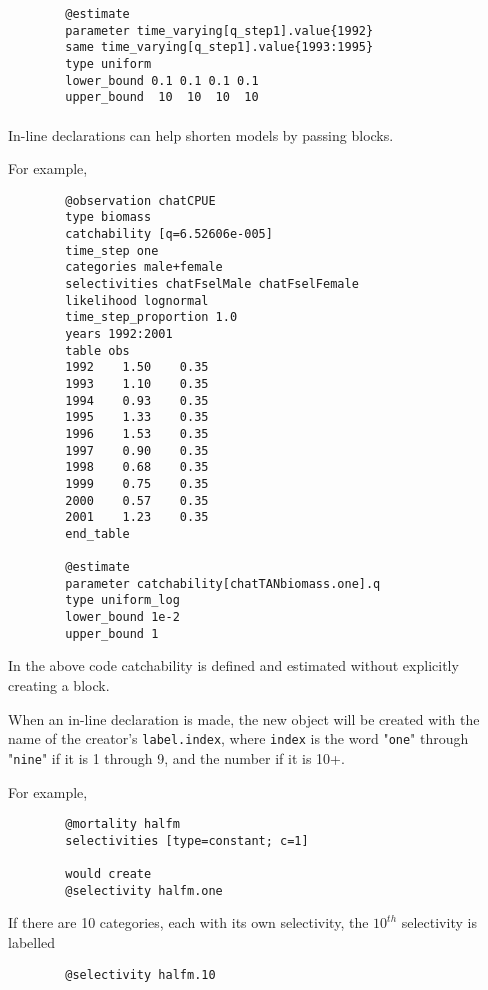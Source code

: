 {\small{\begin{verbatim}
		@estimate
		parameter time_varying[q_step1].value{1992}
		same time_varying[q_step1].value{1993:1995}
		type uniform
		lower_bound 0.1 0.1 0.1 0.1
		upper_bound  10  10  10  10
		\end{verbatim}}}
	
\paragraph*{\label{sec:declare}}

In-line declarations can help shorten models by passing \command{} blocks.

For example,

{\small{\begin{verbatim}
		@observation chatCPUE
		type biomass
		catchability [q=6.52606e-005]
		time_step one
		categories male+female
		selectivities chatFselMale chatFselFemale
		likelihood lognormal
		time_step_proportion 1.0
		years 1992:2001
		table obs
		1992    1.50    0.35
		1993    1.10    0.35
		1994    0.93    0.35
		1995    1.33    0.35
		1996    1.53    0.35
		1997    0.90    0.35
		1998    0.68    0.35
		1999    0.75    0.35
		2000    0.57    0.35
		2001    1.23    0.35
		end_table

		@estimate
		parameter catchability[chatTANbiomass.one].q
		type uniform_log
		lower_bound 1e-2
		upper_bound 1
		\end{verbatim}}}

In the above code catchability is defined and estimated without explicitly creating a  block.

When an in-line declaration is made, the new object will be created with the name of the creator's \texttt{label.index}, where \texttt{index} is the word "\texttt{one}" through "\texttt{nine}" if it is 1 through 9, and the number if it is 10+.

For example,

{\small{\begin{verbatim}
		@mortality halfm
		selectivities [type=constant; c=1]

		would create
		@selectivity halfm.one
		\end{verbatim}}}

If there are 10 categories, each with its own selectivity, the $10^{th}$ selectivity is labelled

{\small{\begin{verbatim}
		@selectivity halfm.10
		\end{verbatim}}}

